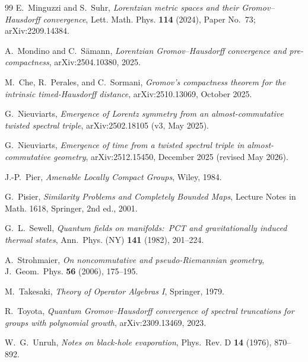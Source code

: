 \documentclass[11pt,a4paper]{article}
\theoremstyle{plain}
\theoremstyle{definition}
\begin{document}
\begin{thebibliography}{99}
E.~Minguzzi and S.~Suhr,
\newblock \emph{Lorentzian metric spaces and their Gromov--Hausdorff
convergence},
\newblock Lett. Math. Phys. \textbf{114} (2024), Paper No.~73;
\newblock arXiv:2209.14384.

A.~Mondino and C.~Sämann,
\newblock \emph{Lorentzian Gromov--Hausdorff convergence
and pre-compactness},
\newblock arXiv:2504.10380, 2025.

M.~Che, R.~Perales, and C.~Sormani,
\newblock \emph{Gromov's compactness theorem for the intrinsic
timed-Hausdorff distance},
\newblock arXiv:2510.13069, October 2025.

G.~Nieuviarts,
\newblock \emph{Emergence of Lorentz symmetry from an almost-commutative
twisted spectral triple},
\newblock arXiv:2502.18105 (v3, May 2025).

G.~Nieuviarts,
\newblock \emph{Emergence of time from a twisted spectral triple in
almost-commutative geometry},
\newblock arXiv:2512.15450, December 2025 (revised May 2026).

J.-P.~Pier,
\newblock \emph{Amenable Locally Compact Groups},
\newblock Wiley, 1984.

G.~Pisier,
\newblock \emph{Similarity Problems and Completely Bounded Maps},
\newblock Lecture Notes in Math. 1618, Springer, 2nd ed., 2001.

G.~L.~Sewell,
\newblock \emph{Quantum fields on manifolds:\ PCT and gravitationally
induced thermal states},
\newblock Ann.~Phys. (NY) \textbf{141} (1982), 201--224.

A.~Strohmaier,
\newblock \emph{On noncommutative and pseudo-Riemannian geometry},
\newblock J.~Geom.~Phys. \textbf{56} (2006), 175--195.

M.~Takesaki,
\newblock \emph{Theory of Operator Algebras I},
\newblock Springer, 1979.

R.~Toyota,
\newblock \emph{Quantum Gromov--Hausdorff convergence of spectral
truncations for groups with polynomial growth},
\newblock arXiv:2309.13469, 2023.

W.~G.~Unruh,
\newblock \emph{Notes on black-hole evaporation},
\newblock Phys.~Rev. D \textbf{14} (1976), 870--892.


\end{thebibliography}
\end{document}
